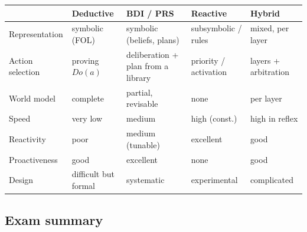 \documentclass[11pt,a4paper]{article}
\theoremstyle{definition}
\begin{document}
\begin{center}
\small
\begin{tabular}{@{}p{}
  >{\raggedright\arraybackslash}p{}
  >{\raggedright\arraybackslash}p{}
  >{\raggedright\arraybackslash}p{}
  >{\raggedright\arraybackslash}p{}@{}}
\toprule
& \textbf{Deductive} & \textbf{BDI / PRS} & \textbf{Reactive} & \textbf{Hybrid} \\
\midrule
Representation & symbolic (FOL) & symbolic (beliefs, plans) & subsymbolic / rules
  & mixed, per layer \\
Action selection & proving $\mathit{Do}(a)$ & deliberation + plan from a library
  & priority / activation & layers + arbitration \\
World model & complete & partial, revisable & none & per layer \\
Speed & very low & medium & high (const.) & high in reflex \\
Reactivity & poor & medium (tunable) & excellent & good \\
Proactiveness & good & excellent & none & good \\
Design & difficult but formal & systematic & experimental & complicated \\
\bottomrule
\end{tabular}
\end{center}

\subsection{Exam summary}
\end{document}
